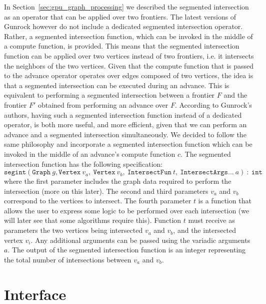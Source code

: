 In Section~\ref{sec:gpu_graph_processing} we described the segmented intersection as an operator that can be applied over two frontiers. The latest versions of Gunrock however do not include a dedicated segmented intersection operator. Rather, a segmented intersection function, which can be invoked in the middle of a compute function, is provided. This means that the segmented intersection function can be applied over two vertices instead of two frontiers, i.e. it intersects the neighbors of the two vertices. Given that the compute function that is passed to the advance operator operates over edges composed of two vertices, the idea is that a segmented intersection can be executed during an advance. This is equivalent to performing a segmented intersection between a frontier $F$ and the frontier $F'$  obtained from performing an advance over $F$. According to Gunrock's authors, having such a segmented intersection function instead of a dedicated operator, is both more useful, and more efficient, given that we can perform an advance and a segmented intersection simultaneously.  We decided to follow the same philosophy and incorporate a segmented intersection function which can be invoked in the middle of an advance's compute function $c$. The segmented intersection function has the following specification: 
%
\begin{displaymath}
\texttt{segint}(\texttt{Graph} \: g, \texttt{Vertex} \: v_a, \: \texttt{Vertex} \: v_b, \: \texttt{IntersectFun} \: t, \: \texttt{IntersectArgs}... \: a) \: : \: \texttt{int}
\end{displaymath}
%
where the first parameter includes the graph data required to perform the intersection (more on this later). The second and third parameters $v_a$ and $v_b$ correspond to the vertices to intersect. The fourth parameter $t$ is a function that allows the user to express some logic to be performed over each intersection (we will later see that some algorithms require this). Function $t$ must receive as parameters the two vertices being intersected $v_a$ and $v_b$, and the intersected vertex $v_i$. Any additional arguments can be passed using the variadic arguments $a$. The output of the segmented intersection function is an integer representing the total number of intersections between $v_a$ and $v_b$.

\section{Interface}
\label{sec:marrow_graph_interface}

